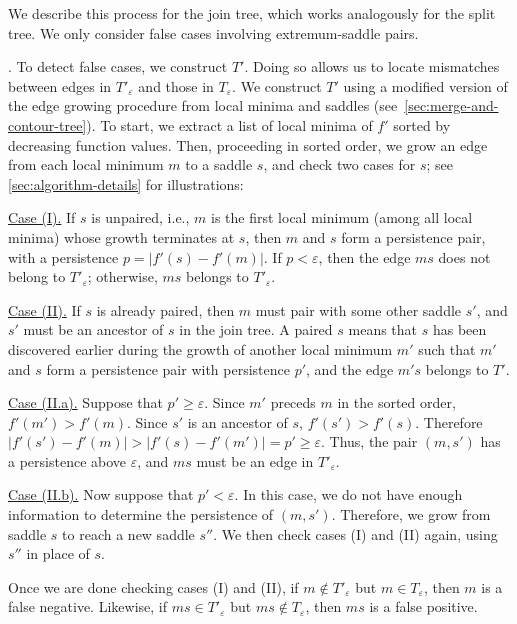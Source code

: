 We describe this process for the join tree, which works analogously for the split tree. We only consider false cases involving extremum-saddle pairs. 

. To detect false cases, we construct $T'$. Doing so allows us to locate mismatches between edges in $T'_\varepsilon$ and those in $T_\varepsilon$.
We construct $T'$ using a modified version of the edge growing procedure from local minima and saddles (see~\cref{sec:merge-and-contour-tree}).
To start, we extract a list of local minima of $f'$ sorted by decreasing function values. Then, proceeding in sorted order, we grow an edge from each local minimum $m$ to a saddle $s$, and check two cases for $s$; see \cref{sec:algorithm-details} for illustrations: 

\underline{Case (I).} If $s$ is unpaired, i.e., $m$ is the first local minimum (among all local minima) whose growth terminates at $s$, then $m$ and $s$ form a persistence pair, with a persistence $p =|f'(s)-f'(m)|$. 
If $p < \varepsilon$, then the edge $ms$ does not belong to $T'_\varepsilon$; otherwise, $ms$ belongs to $T'_\varepsilon$.  

\underline{Case (II).} If $s$ is already paired, then $m$ must pair with some other saddle $s'$, and $s'$ must be an ancestor of $s$ in the join tree. A paired $s$ means that $s$ has been discovered earlier during the growth of another local minimum $m'$ such that $m'$ and $s$ form a persistence pair with persistence $p'$, and the edge $m's$ belongs to $T'$. 

\underline{Case (II.a).} 
Suppose that $p' \geq \varepsilon$. Since $m'$ preceds $m$ in the sorted order, $f'(m') > f'(m)$. Since $s'$ is an ancestor of $s$, $f'(s') > f'(s)$. Therefore $|f'(s') - f'(m)| > |f'(s) - f'(m')| = p' \geq \varepsilon$. 
Thus, the pair $(m,s')$ has a persistence above $\varepsilon$, and $ms$ must be an edge in $T'_\varepsilon$.

\underline{Case (II.b).} 
Now suppose that $p' < \varepsilon$. In this case, we do not have enough information to determine the persistence of $(m,s')$. Therefore, we grow from saddle $s$ to reach a new saddle $s''$. We then check cases (I) and (II) again, using $s''$ in place of $s$. 

Once we are done checking cases (I) and (II), if $m \notin T'_{\varepsilon}$ but $m \in T_{\varepsilon}$, then $m$ is a false negative. 
Likewise, if $ms \in T'_{\varepsilon}$ but $ms \notin T_{\varepsilon}$, then $ms$ is a false positive. 

